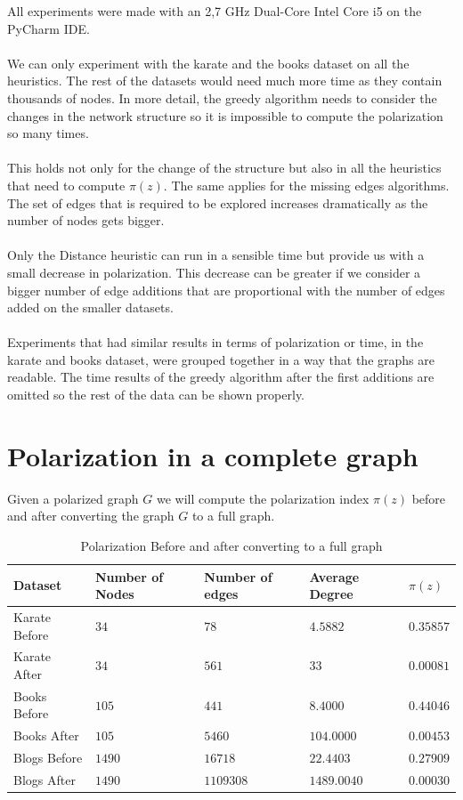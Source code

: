 All experiments were made with an 2,7 GHz Dual-Core Intel Core i5 on the PyCharm IDE.
\\
\\
 We can only experiment with the karate and the books dataset on all the heuristics. The rest of the datasets would need much more time as they contain thousands of nodes. In more detail, the greedy algorithm needs to consider the changes in the network structure so it is impossible to compute the polarization so many times.
\\
\\ 
This holds not only for the change of the structure but also in all the heuristics that need to compute $\pi(z)$. The same applies for the missing edges algorithms. The set of edges that is required to be explored increases dramatically as the number of nodes gets bigger. 
\\
\\
Only the Distance heuristic can run in a sensible time but provide us with a small decrease in polarization. This decrease can be greater if we consider a bigger number of edge additions that are proportional with the number of edges added on the smaller datasets. 
\\
\\
Experiments that had similar results in terms of polarization or time, in the karate and books dataset, were grouped together in a way that the graphs are readable. The time results of the greedy algorithm after the first additions are omitted so the rest of the data can be shown properly.

\section{Polarization in a complete graph}
\label{sec:fullgraph}
\vspace{20pt}
Given a polarized graph $G$ we will compute the polarization index $\pi(z)$ before and after converting the graph $G$ to a full graph. 

\begin{table}[!htbp]
 \centering
 \caption{Polarization Before and after converting to a full graph}
 \label{tab:fullgraph}
 \begin{tabular}{| l || l | l | l | l |}
 \hline
  Dataset & Number of Nodes & Number of edges & Average Degree & $\pi(z)$\\
  \hline
  \hline
  Karate Before & $34$ & $78$ & $4.5882$ &  $0.35857$\\
  \hline
  Karate After & $34$ & $561$ & $33$ &  $0.00081$\\
  \hline
  \hline
  Books Before & $105$ & $441$ & $8.4000$ &  $0.44046$\\
  \hline
  Books After & $105$ & $5460$ & $104.0000$ &  $0.00453$\\
  \hline
  \hline
  Blogs Before & $1490$ & $16718$ & $22.4403$ &  $0.27909$\\
  \hline
  Blogs After & $1490$ & $1109308$ & $1489.0040$ &  $0.00030$\\
  \hline
 \end{tabular}
 \end{table}

